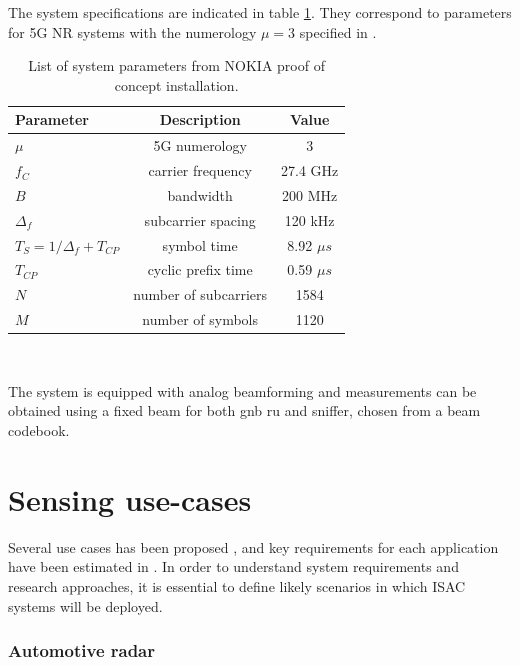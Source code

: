 	
	The system specifications are indicated in table \ref{table:PoCparams}.
	They correspond to parameters for 5G NR systems with the numerology $\mu=3$ specified in \cite{TS138211}. 
	
	\begin{table}[H]
		\centering 
		\begin{tabular}{|p{9em} c c |}
			\hline
			\rowcolor{bluepoli!40} %
			\textbf{Parameter} & \textbf{Description} & \textbf{Value}  \T\B \\
			\hline \hline
			$\mu$ & 5G numerology & 3 \T\B \\
			$f_C$ & carrier frequency & 27.4 GHz \T\B \\
			$B$ & bandwidth & 200 MHz \T\B\\
			$\Delta_f$ & subcarrier spacing & 120 kHz  \T\B\\
			$T_S = 1/\Delta_f + T_{CP}$ & symbol time & 8.92 $\mu s$  \T\B\\
			$T_{CP}$ & cyclic prefix time & 0.59 $\mu s$  \T\B\\
			$N$ & number of subcarriers & 1584  \T\B\\
			$M$ & number of symbols & 1120  \B\\
			
			\hline
		\end{tabular}
		\\[10pt]
		\caption{List of system parameters from NOKIA proof of concept installation.}
		\label{table:PoCparams}
	\end{table}
	
	The system is equipped with analog beamforming and measurements can be obtained using a fixed beam for both \gls{gnb} \gls{ru} and sniffer, chosen from a beam codebook.


\section{Sensing use-cases}

	Several use cases has been proposed \cite{Mandelli_Henninger_Bauhofer_Wild_2023}, \cite{Wang_Varshney_Gentile_Blandino_Chuang_Golmie_2022} and  key requirements for each application have been estimated in \cite{Wild_Braun_Viswanathan_2021}.
	In order to understand system requirements and research approaches, it is essential to define likely scenarios in which ISAC systems will be deployed.
	
	\subsubsection{Automotive radar}
	
